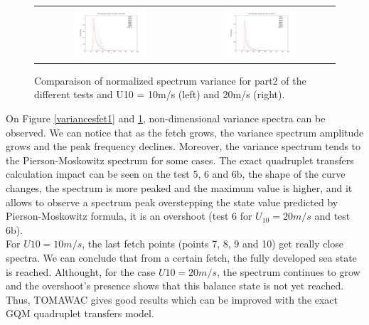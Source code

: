 \begin{figure}[h!]
\begin{tabular}{cc}
\includegraphics[width=0.5\textwidth]{variance_ad_free_mesh_t6b_v10.pdf} & \includegraphics[width=0.5\textwidth]{variance_ad_free_mesh_t6b_v20.pdf}\\
\end{tabular}
\caption{Comparaison of normalized spectrum variance for part2 of the different tests and U10 = 10m/s (left) and 20m/s (right).}
\label{variancesfet2}
\end{figure}
On Figure \ref{variancesfet1} and \ref{variancesfet2}, non-dimensional variance spectra can be observed. We can notice that as the fetch grows, the variance spectrum amplitude grows and the peak frequency declines. Moreover, the variance spectrum tends to the Pierson-Moskowitz spectrum for some cases. The exact quadruplet transfers calculation impact can be seen on the test 5, 6 and 6b, the shape of the curve changes, the spectrum is more peaked and the maximum value is higher, and it allows to observe a spectrum peak overstepping the state value predicted by Pierson-Moskowitz formula, it is an overshoot (test 6 for $U_{10} = 20m/s$ and test 6b).\\
For $U10 = 10m/s$, the last fetch points (points 7, 8, 9 and 10) get really close spectra. We can conclude that from a certain fetch, the fully developed sea state is reached. Althought, for the case $U10 = 20m/s$, the spectrum continues to grow and the overshoot's presence shows that this balance state is not yet reached. Thus, TOMAWAC gives good results which can be improved with the exact GQM quadruplet transfers model.

